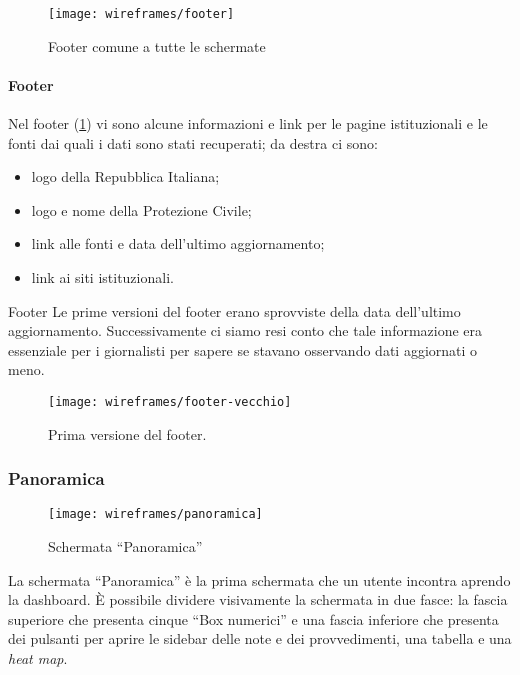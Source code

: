 \begin{figure}[H]
    \centering
    \texttt{[image: wireframes/footer]}
    \caption{Footer comune a tutte le schermate}\label{fig:footer}
\end{figure}

\paragraph{Footer}
Nel footer (\ref{fig:footer}) vi sono alcune informazioni e link per le pagine istituzionali e le fonti dai quali i dati sono stati recuperati; da destra ci sono:
\begin{itemize}
    \item logo della Repubblica Italiana;
    \item logo e nome della Protezione Civile;
    \item link alle fonti e data dell'ultimo aggiornamento;
    \item link ai siti istituzionali.
\end{itemize}

\begin{bclogo}{Footer}
    Le prime versioni del footer erano sprovviste della data dell'ultimo aggiornamento. Successivamente ci siamo resi conto che tale informazione era essenziale per i giornalisti per sapere se stavano osservando dati aggiornati o meno.
\begin{figure}[H]
    \centering
    \texttt{[image: wireframes/footer-vecchio]}
    \caption{Prima versione del footer.}\label{fig:footer-vecchio}
\end{figure}
\end{bclogo}


\subsubsection{Panoramica}\label{ss:panoramica}
\begin{figure}[H]
    \centering
    \texttt{[image: wireframes/panoramica]}
    \caption{Schermata ``Panoramica''}\label{fig:panoramica}
\end{figure}
La schermata ``Panoramica'' è la prima schermata che un utente incontra aprendo la dashboard. \`E possibile dividere visivamente la schermata in due fasce: la fascia superiore che presenta cinque ``Box numerici'' e una fascia inferiore che presenta dei pulsanti per aprire le sidebar delle note e dei provvedimenti, una tabella e una \textit{heat map}.\\

